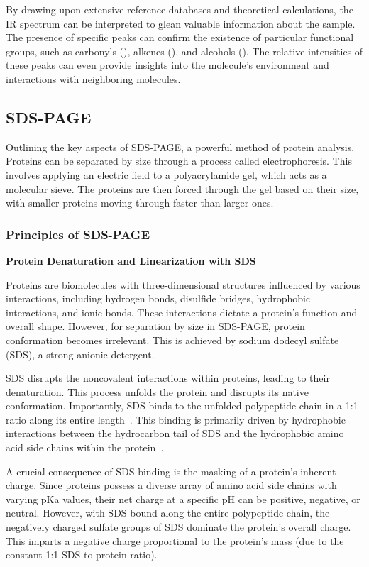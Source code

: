By drawing upon extensive reference databases and theoretical calculations, the IR spectrum
can be interpreted to glean valuable information about the sample.
The presence of specific peaks can confirm the existence of particular functional groups, such as carbonyls (), alkenes (), and alcohols ().
The relative intensities of these peaks can even provide insights into the molecule's environment and interactions with neighboring molecules.

\newpage

\subsection{SDS-PAGE\authorB}
Outlining the key aspects of SDS-PAGE, a powerful method of protein analysis.
Proteins can be separated by size through a process called electrophoresis.
This involves applying an electric field to a polyacrylamide gel, which acts as a molecular sieve.
The proteins are then forced through the gel based on their size, with smaller proteins moving through faster than larger ones.

\subsubsection{Principles of SDS-PAGE}

\textbf{Protein Denaturation and Linearization with SDS}

Proteins are biomolecules with three-dimensional structures influenced by various interactions, including hydrogen bonds, disulfide bridges, hydrophobic interactions, and ionic bonds.
These interactions dictate a protein's function and overall shape.
However, for separation by size in SDS-PAGE, protein conformation becomes irrelevant.
This is achieved by sodium dodecyl sulfate (SDS), a strong anionic detergent.

SDS disrupts the noncovalent interactions within proteins, leading to their denaturation.
This process unfolds the protein and disrupts its native conformation. Importantly, SDS
binds to the unfolded polypeptide chain in a 1:1 ratio along its entire length~\cite{sdspageassay}. This
binding is primarily driven by hydrophobic interactions between the hydrocarbon tail of
SDS and the hydrophobic amino acid side chains within the protein~\cite{sdsimpact}.

A crucial consequence of SDS binding is the masking of a protein's inherent charge. Since
proteins possess a diverse array of amino acid side chains with varying pKa values, their
net charge at a specific pH can be positive, negative, or neutral. However, with SDS bound
along the entire polypeptide chain, the negatively charged sulfate groups of SDS
dominate the protein's overall charge. This imparts a negative charge proportional to the
protein's mass (due to the constant 1:1 SDS-to-protein ratio).

